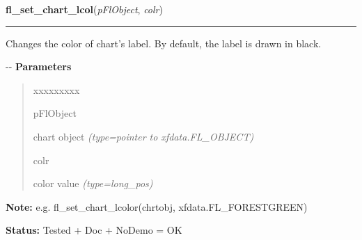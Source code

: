 \hspace{.8\funcindent}\begin{boxedminipage}{\funcwidth}

    \raggedright \textbf{fl\_set\_chart\_lcol}(\textit{pFlObject}, \textit{colr})

    \vspace{-1.5ex}

    \rule{\textwidth}{0.5\fboxrule}
\setlength{\parskip}{2ex}

Changes the color of chart's label. By default, the label is
drawn in black.

-{}-
\setlength{\parskip}{1ex}
      \textbf{Parameters}
      \vspace{-1ex}

      \begin{quote}
        \begin{Ventry}{xxxxxxxxx}

          \item[pFlObject]


chart object
            {\it (type=pointer to xfdata.FL\_OBJECT)}

          \item[colr]


color value
            {\it (type=long\_pos)}

        \end{Ventry}

      \end{quote}

\textbf{Note:} 
e.g. fl\_set\_chart\_lcolor(chrtobj, xfdata.FL\_FORESTGREEN)


\textbf{Status:} 
Tested + Doc + NoDemo = OK


    \end{boxedminipage}

    \label{xformslib:flchart:fl_set_chart_baseline}

    \vspace{0.5ex}

